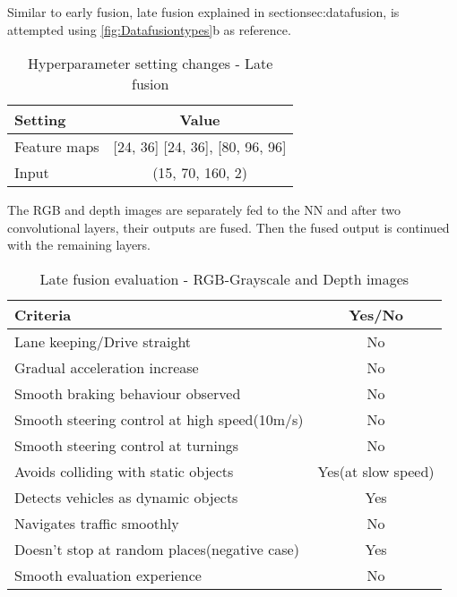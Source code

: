 Similar to early fusion, late fusion explained in section{sec:datafusion}, is attempted
using \ref{fig:Datafusiontypes}b as reference.
\begin{table}[!ht]
    \centering
\begin{tabular}{lc}
    \toprule
    Setting  & Value  \\\midrule
    Feature maps  & [24, 36] [24, 36], [80, 96, 96]  \\
    Input  & (15, 70, 160, 2)\\\bottomrule
\end{tabular}
\caption{Hyperparameter setting changes - Late fusion}
\label{table:paramsLF}
\end{table}
The RGB and depth images are separately fed to the NN and after two convolutional layers,
their outputs are fused. Then the fused output is continued with the remaining layers.
\begin{table}[!ht]
    \centering
\begin{tabular}{lc}
    \toprule
    Criteria  & Yes/No\\\midrule
    Lane keeping/Drive straight  & No  \\
    Gradual acceleration increase  & No\\
    Smooth braking behaviour observed & No \\
    Smooth steering control at high speed(10m/s) & No \\
    Smooth steering control at turnings & No\\
    Avoids colliding with static objects & Yes(at slow speed) \\
    Detects vehicles as dynamic objects & Yes \\
    Navigates traffic smoothly & No\\
    Doesn't stop at random places(negative case) & Yes \\
    Smooth evaluation experience & No \\\bottomrule
\end{tabular}
\caption{Late fusion evaluation - RGB-Grayscale and Depth images}
\label{table:latefusionrgbdepth}
\end{table}

